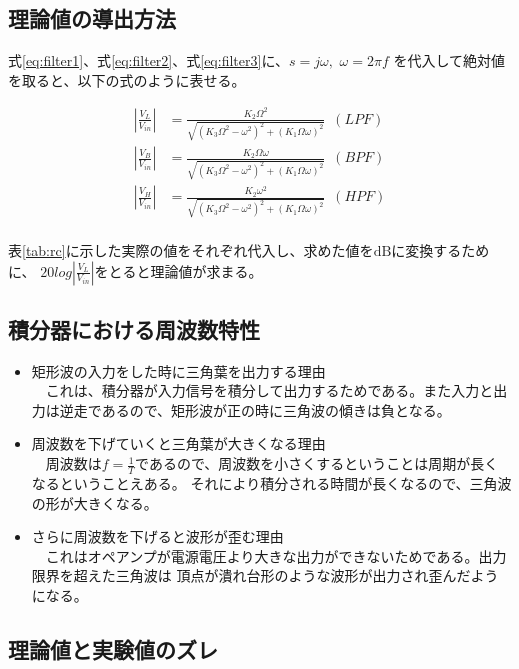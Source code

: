 \documentclass[11pt,a4j]{jsarticle}
\begin{document}
\subsection{理論値の導出方法}
\label{sub:理論値の導出方法}

式\ref{eq:filter1}、式\ref{eq:filter2}、式\ref{eq:filter3}に、$s=j\omega, \,\, \omega=2\pi f$
を代入して絶対値を取ると、以下の式のように表せる。

\begin{align}
  \left| \frac{V_L}{V_{in}} \right| &= \frac{K_2\Omega^2}{\sqrt{(K_3\Omega^2-\omega^2)^2 + (K_1\Omega\omega)^2}} \,\,\, (LPF) \\
  \left| \frac{V_B}{V_{in}} \right| &= \frac{K_2\Omega\omega}{\sqrt{(K_3\Omega^2-\omega^2)^2 + (K_1\Omega\omega)^2}} \,\,\, (BPF) \\
  \left| \frac{V_H}{V_{in}} \right| &= \frac{K_2\omega^2}{\sqrt{(K_3\Omega^2-\omega^2)^2 + (K_1\Omega\omega)^2}} \,\,\, (HPF) \\
\end{align}

表\ref{tab:rc}に示した実際の値をそれぞれ代入し、求めた値を$\mathrm{dB}$に変換するために、
$20log\left| \frac{V_L}{V_{in}} \right|$をとると理論値が求まる。

\subsection{積分器における周波数特性}
\label{sub:積分器における周波数特性}

\begin{itemize}
  \item 矩形波の入力をした時に三角葉を出力する理由 \\
  　これは、積分器が入力信号を積分して出力するためである。また入力と出力は逆走であるので、矩形波が正の時に三角波の傾きは負となる。
  \item 周波数を下げていくと三角葉が大きくなる理由 \\
  　周波数は$f=\frac{1}{T}$であるので、周波数を小さくするということは周期が長くなるということえある。
  それにより積分される時間が長くなるので、三角波の形が大きくなる。
  \item さらに周波数を下げると波形が歪む理由 \\
  　これはオペアンプが電源電圧より大きな出力ができないためである。出力限界を超えた三角波は
  頂点が潰れ台形のような波形が出力され歪んだようになる。
\end{itemize}

\subsection{理論値と実験値のズレ}
\label{sub:理論値と実験値のズレ}
\end{document}
